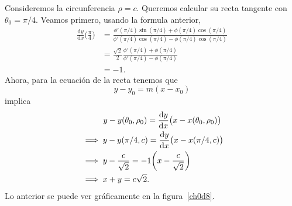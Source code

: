 \documentclass[mid,fleqn,draft,twoside]{notasdeclase}
\begin{document}
\begin{ejem}
	Considere\-mos la circunferencia $\rho=c$. Queremos calcular su recta tangente con $\theta_0=\pi/4$. Veamos primero, usando la formula anterior,
	\begin{align*}
		\frac{\mathrm dy}{\mathrm dx}\bigg(\frac \pi 4\bigg) &= \frac{\phi'(\pi/4)\sin(\pi/4) + \phi(\pi/4)\cos(\pi/4)}{\phi'(\pi/4)\cos(\pi/4) - \phi(\pi/4)\cos(\pi/4)} \\
		&= \frac{\sqrt 2}{2}  \frac{\phi'(\pi/4) + \phi(\pi/4)}{\phi'(\pi/4) - \phi(\pi/4)} \\
		&= -1.
	\end{align*}
	Ahora, para la ecuación de la recta tenemos que
	\[ y-y_0 = m(x-x_0) \]
	implica
    \begin{align*}
    	&\phantom{\implies}\hspace{.6em} y-y(\theta_0,\rho_0) = \frac{\mathrm dy}{\mathrm dx} \big(x-x(\theta_0,\rho_0)\big) \\
    	&\implies y-y(\pi/4,c) = \frac{\mathrm dy}{\mathrm dx} \big(x-x(\pi/4,c)\big)\\
    	&\implies y -\frac{c}{\sqrt 2} = -1\bigg(x-\frac{c}{\sqrt 2}\bigg) \\
    	&\implies x+y = c\sqrt 2.
    \end{align*}
    Lo anterior se puede ver gráficamente en la figura~\ref{ch0d8}.
%    
\end{ejem}
\end{document}
